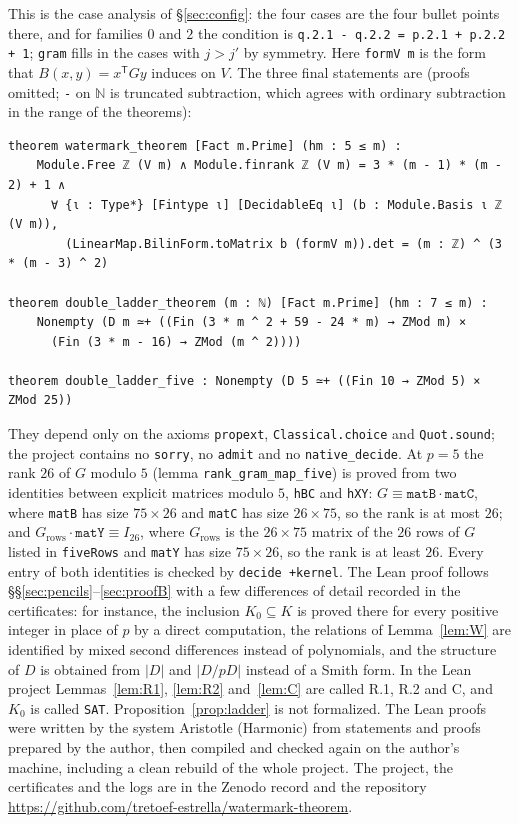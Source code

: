 \documentclass[11pt]{article}
\theoremstyle{definition}
\theoremstyle{remark}
\newcommand{\SAT}{K_0}
\begin{document}
This is the case analysis of \S\ref{sec:config}: the four cases are the four bullet points there, and for families $0$ and $2$ the condition is \mbox{\texttt{q.2.1 - q.2.2 = p.2.1 + p.2.2 + 1}}; \texttt{gram} fills in the cases with $j>j'$ by symmetry. Here \texttt{formV m} is the form that $B(x,y)=x^{\mathsf T}Gy$ induces on $V$. The three final statements are (proofs omitted; \texttt{-} on $\mathbb N$ is truncated subtraction, which agrees with ordinary subtraction in the range of the theorems):
\begin{lstlisting}
theorem watermark_theorem [Fact m.Prime] (hm : 5 ≤ m) :
    Module.Free ℤ (V m) ∧ Module.finrank ℤ (V m) = 3 * (m - 1) * (m - 2) + 1 ∧
      ∀ {ι : Type*} [Fintype ι] [DecidableEq ι] (b : Module.Basis ι ℤ (V m)),
        (LinearMap.BilinForm.toMatrix b (formV m)).det = (m : ℤ) ^ (3 * (m - 3) ^ 2)

theorem double_ladder_theorem (m : ℕ) [Fact m.Prime] (hm : 7 ≤ m) :
    Nonempty (D m ≃+ ((Fin (3 * m ^ 2 + 59 - 24 * m) → ZMod m) ×
      (Fin (3 * m - 16) → ZMod (m ^ 2))))

theorem double_ladder_five : Nonempty (D 5 ≃+ ((Fin 10 → ZMod 5) × ZMod 25))
\end{lstlisting}
They depend only on the axioms \texttt{propext}, \texttt{Classical.choice} and \texttt{Quot.sound}; the project contains no \texttt{sorry}, no \texttt{admit} and no \texttt{native\_decide}. At $p=5$ the rank $26$ of $G$ modulo $5$ (lemma \texttt{rank\_gram\_map\_five}) is proved from two identities between explicit matrices modulo $5$, \texttt{hBC} and \texttt{hXY}: $G\equiv\texttt{matB}\cdot\texttt{matC}$, where \texttt{matB} has size $75\times26$ and \texttt{matC} has size $26\times75$, so the rank is at most $26$; and $G_{\mathrm{rows}}\cdot\texttt{matY}\equiv I_{26}$, where $G_{\mathrm{rows}}$ is the $26\times75$ matrix of the $26$ rows of $G$ listed in \texttt{fiveRows} and \texttt{matY} has size $75\times26$, so the rank is at least $26$. Every entry of both identities is checked by \texttt{decide +kernel}. The Lean proof follows \S\S\ref{sec:pencils}--\ref{sec:proofB} with a few differences of detail recorded in the certificates: for instance, the inclusion $\SAT\subseteq K$ is proved there for every positive integer in place of $p$ by a direct computation, the relations of Lemma~\ref{lem:W} are identified by mixed second differences instead of polynomials, and the structure of $D$ is obtained from $|D|$ and $|D/pD|$ instead of a Smith form. In the Lean project Lemmas~\ref{lem:R1}, \ref{lem:R2} and~\ref{lem:C} are called R.1, R.2 and C, and $\SAT$ is called \texttt{SAT}. Proposition~\ref{prop:ladder} is not formalized. The Lean proofs were written by the system Aristotle (Harmonic) \cite{Aristotle} from statements and proofs prepared by the author, then compiled and checked again on the author's machine, including a clean rebuild of the whole project. The project, the certificates and the logs are in the Zenodo record \cite{WMDLZenodo} and the repository \url{https://github.com/tretoef-estrella/watermark-theorem}.
\end{document}
